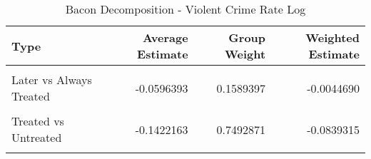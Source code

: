 \begin{table}[H]

\caption{\label{tab:tab:bacondecompositionViolent}Bacon Decomposition - Violent Crime Rate Log}
\centering
\begin{tabular}[t]{lrrr}
\toprule
Type & Average Estimate & Group Weight & Weighted Estimate\\
\midrule
\cellcolor{gray!6}{Earlier vs Later Treated} & \cellcolor{gray!6}{0.1000224} & \cellcolor{gray!6}{0.0683810} & \cellcolor{gray!6}{0.0051705}\\
Later vs Always Treated & -0.0596393 & 0.1589397 & -0.0044690\\
\cellcolor{gray!6}{Later vs Earlier Treated} & \cellcolor{gray!6}{0.0208665} & \cellcolor{gray!6}{0.0233921} & \cellcolor{gray!6}{-0.0017883}\\
Treated vs Untreated & -0.1422163 & 0.7492871 & -0.0839315\\
\cellcolor{gray!6}{Total TWFE} & \cellcolor{gray!6}{NaN} & \cellcolor{gray!6}{NaN} & \cellcolor{gray!6}{-0.0850183}\\
\bottomrule
\end{tabular}
\end{table}
